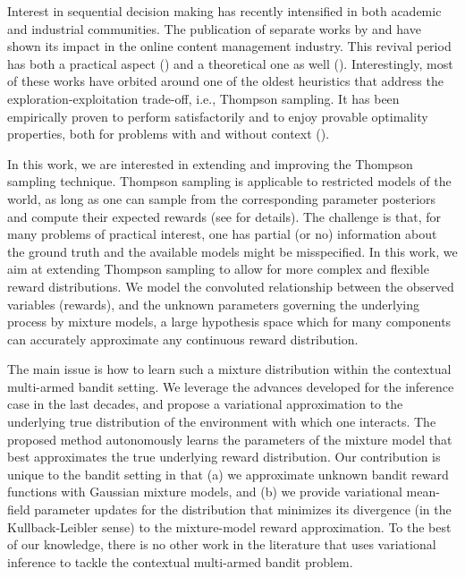 \documentclass{article}
\newcommand{\ie}{i.e., }
\begin{document}
Interest in sequential decision making has recently intensified in both academic and industrial communities. The publication of separate works by \cite{ic-Chapelle2011} and \cite{j-Scott2015} have shown its impact in the online content management industry. This revival period has both a practical aspect (\cite{j-Li2010}) and a theoretical one as well (\cite{j-Scott2010,j-Agrawal2011,ip-Maillard2011}). Interestingly, most of these works have orbited around one of the oldest heuristics that address the exploration-exploitation trade-off, \ie Thompson sampling. It has been empirically proven to perform satisfactorily and to enjoy provable optimality properties, both for problems with and without context (\cite{j-Agrawal2012,j-Agrawal2012a,ic-Korda2013,j-Russo2014,j-Russo2016}).

In this work, we are interested in extending and improving the Thompson sampling technique. Thompson sampling is applicable to restricted models of the world, as long as one can sample from the corresponding parameter posteriors and compute their expected rewards (see \cite{j-Scott2010} for details). The challenge is that, for many problems of practical interest, one has partial (or no) information about the ground truth and the available models might be misspecified. In this work, we aim at extending Thompson sampling to allow for more complex and flexible reward distributions. We model the convoluted relationship between the observed variables (rewards), and the unknown parameters governing the underlying process by mixture models, a large hypothesis space which for many components can accurately approximate any continuous reward distribution.

The main issue is how to learn such a mixture distribution within the contextual multi-armed bandit setting. We leverage the advances developed for the inference case in the last decades, and propose a variational approximation to the underlying true distribution of the environment with which one interacts. The proposed method autonomously learns the parameters of the mixture model that best approximates the true underlying reward distribution. Our contribution is unique to the bandit setting in that (a) we approximate unknown bandit reward functions with Gaussian mixture models, and (b) we provide variational mean-field parameter updates for the distribution that minimizes its divergence (in the Kullback-Leibler sense) to the mixture-model reward approximation. To the best of our knowledge, there is no other work in the literature that uses variational inference to tackle the contextual multi-armed bandit problem. 
\end{document}
